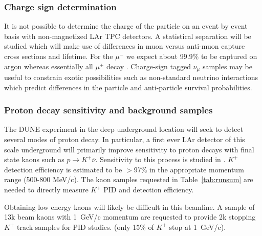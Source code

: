 \subsubsection{Charge sign determination}

It is not possible to determine the charge of the particle on an event by event basis with non-magnetized LAr TPC detectors. A statistical separation will be studied which will make use of differences in muon versus anti-muon capture cross sections and lifetime.
For the $\mu^-$ we expect about 99.9\% to be captured on argon whereas essentially all $\mu^+$ decay \cite{stopmu}.
Charge-sign tagged $\nu_\mu$ samples may be useful to constrain exotic possibilities such as
non-standard neutrino interactions which predict differences in the particle and anti-particle survival probabilities. 


\subsubsection{Proton decay sensitivity and background samples}


The DUNE experiment in the deep underground location will seek to detect several modes of proton decay.
In particular, a first ever LAr detector of this scale underground will primarily improve sensitivity to 
proton decays with final state kaons such as  ${p \rightarrow K^+ \overline{\nu}}$. 
Sensitivity to this process is studied in \cite{bueno}. $K^+$ detection efficiency is estimated to be $>$97\% in the
appropriate momentum range (500-800 MeV/c). The kaon samples requested in Table~\ref{tab:runsum} are needed to directly measure 
$K^+$ PID and detection efficiency. 

Obtaining low energy kaons will likely be difficult in this beamline.
A sample of 13k beam kaons with 1~GeV/c momentum are requested to provide 2k stopping $K^+$ track samples for PID studies.
(only 15\% of $K^+$ stop at 1~GeV/c).



